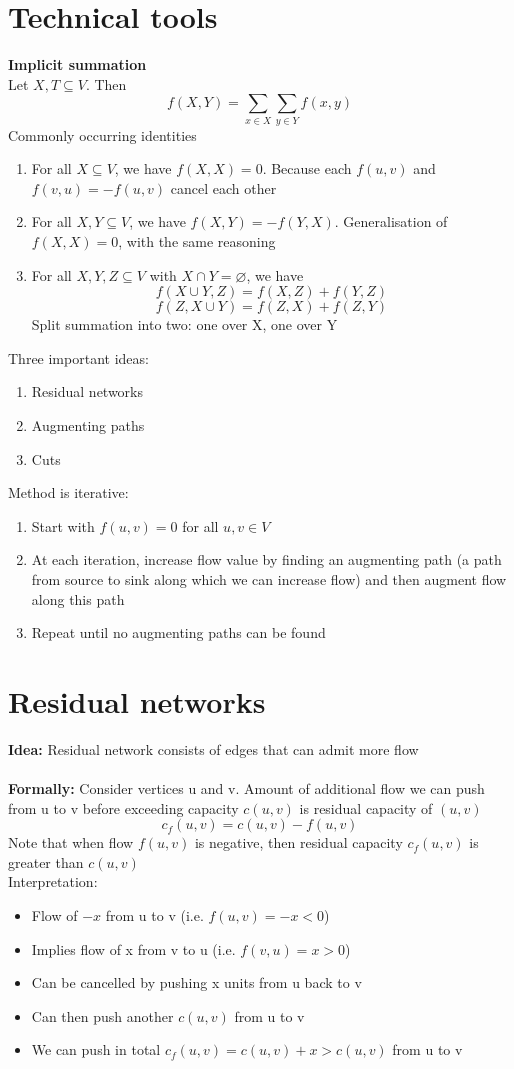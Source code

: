 \documentclass{article}[18pt]
\begin{document}
\section{Technical tools}
\textbf{Implicit summation}\\
Let $X,T\subseteq V$. Then
\[
f(X, Y)=\sum_{x \in X} \sum_{y \in Y} f(x, y)
\]
Commonly occurring identities
\begin{enumerate}
	\item For all $X\subseteq V$, we have $f(X,X)=0$. Because each $f(u,v)$ and $f(v,u)=-f(u,v)$ cancel each other
	\item For all $X,Y\subseteq V$, we have $f(X,Y)=-f(Y,X)$. Generalisation of $f(X,X)=0$, with the same reasoning
	\item For all $X,Y,Z\subseteq V$ with $X\cap Y=\varnothing$, we have
	$$f(X\cup Y, Z)=f(X,Z)+f(Y,Z)$$
	$$f(Z,X\cup Y) = f(Z,X) + f(Z,Y)$$
	Split summation into two: one over X, one over Y
\end{enumerate}
Three important ideas:
\begin{enumerate}
	\item Residual networks
	\item Augmenting paths
	\item Cuts
\end{enumerate}
Method is iterative:
\begin{enumerate}
	\item Start with $f(u,v)=0$ for all $u,v\in V$
	\item At each iteration, increase flow value by finding an augmenting path (a path from source to sink along which we can increase flow) and then augment flow along this path
	\item Repeat until no augmenting paths can be found
\end{enumerate}
\section{Residual networks}
\textbf{Idea:} Residual network consists of edges that can admit more flow\\
\\
\textbf{Formally:} Consider vertices u and v. Amount of additional flow we can push from u to v before exceeding capacity $c(u,v)$ is residual capacity of $(u,v)$
$$c_f(u,v)  = c(u,v) - f(u,v)$$
Note that when flow $f(u,v)$ is negative, then residual capacity $c_f(u,v)$ is greater than $c(u,v)$\\
Interpretation:
\begin{itemize}
	\item Flow of $-x$ from u to v (i.e. $f(u,v)=-x<0$)
	\item Implies flow of x from v to u (i.e. $f(v,u)=x>0$)
	\item Can be cancelled by pushing x units from u back to v
	\item Can then push another $c(u,v)$ from u to v
	\item We can push in total $c_f(u,v)=c(u,v)+x>c(u,v)$ from u to v
\end{itemize}
\end{document}
